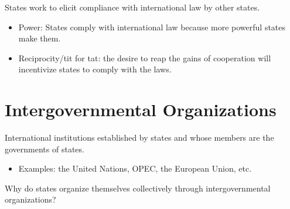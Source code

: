 \documentclass[
]{book}
\providecommand{\tightlist}{%
  \setlength{\itemsep}{0pt}\setlength{\parskip}{0pt}}
\begin{document}
States work to elicit compliance with international law by other states.

\begin{itemize}
\item
  Power: States comply with international law because more powerful states make them.
\item
  Reciprocity/tit for tat: the desire to reap the gains of cooperation will incentivize states to comply with the laws.
\end{itemize}

\hypertarget{intergovernmental-organizations}{%
\section{Intergovernmental Organizations}\label{intergovernmental-organizations}}

International institutions established by states and whose members are the governments of states.

\begin{itemize}
\tightlist
\item
  Examples: the United Nations, OPEC, the European Union, etc.
\end{itemize}

Why do states organize themselves collectively through intergovernmental organizations?
\end{document}
